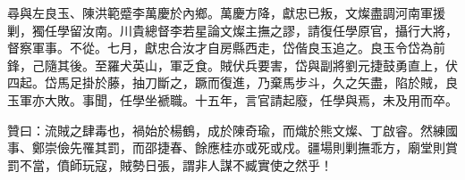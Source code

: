 \begin{pinyinscope}
尋與左良玉、陳洪範蹙李萬慶於內鄉。萬慶方降，獻忠已叛，文燦盡調河南軍援剿，獨任學留汝南。川貴總督李若星論文燦主撫之謬，請復任學原官，攝行大將，督察軍事。不從。七月，獻忠合汝才自房縣西走，岱偕良玉追之。良玉令岱為前鋒，己隨其後。至羅犬英山，軍乏食。賊伏兵要害，岱與副將劉元捷鼓勇直上，伏四起。岱馬足掛於藤，抽刀斷之，蹶而復進，乃棄馬步斗，久之矢盡，陷於賊，良玉軍亦大敗。事聞，任學坐褫職。十五年，言官請起廢，任學與焉，未及用而卒。

贊曰：流賊之肆毒也，禍始於楊鶴，成於陳奇瑜，而熾於熊文燦、丁啟睿。然練國事、鄭崇儉先罹其罰，而邵捷春、餘應桂亦或死或戍。疆場則剿撫乖方，廟堂則賞罰不當，僨師玩寇，賊勢日張，謂非人謀不臧實使之然乎！


\end{pinyinscope}